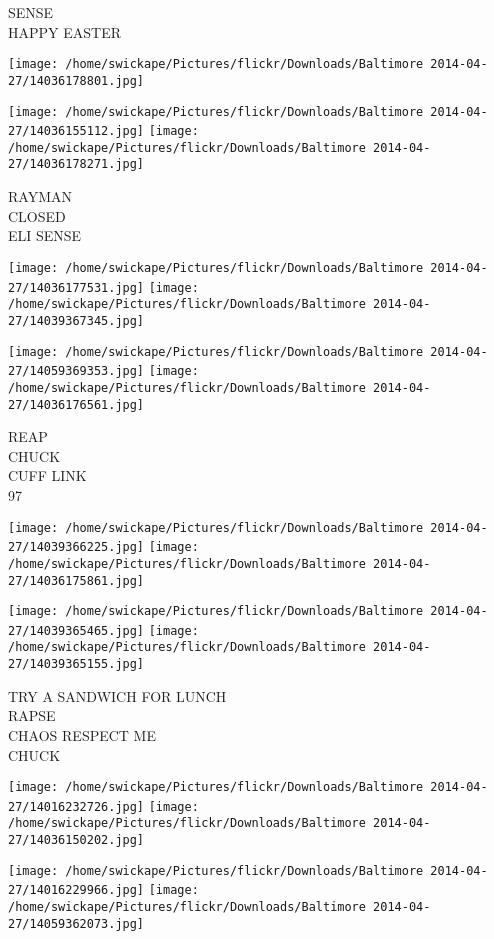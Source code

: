 \documentclass[10pt,letterpaper]{article}
\begin{document}
SENSE\\
HAPPY EASTER
\pagebreak

\texttt{[image: /home/swickape/Pictures/flickr/Downloads/Baltimore 2014-04-27/14036178801.jpg]}

\vspace{0.25in}
\texttt{[image: /home/swickape/Pictures/flickr/Downloads/Baltimore 2014-04-27/14036155112.jpg]}
\texttt{[image: /home/swickape/Pictures/flickr/Downloads/Baltimore 2014-04-27/14036178271.jpg]}

RAYMAN\\
CLOSED\\
ELI SENSE
\pagebreak

\texttt{[image: /home/swickape/Pictures/flickr/Downloads/Baltimore 2014-04-27/14036177531.jpg]}
\texttt{[image: /home/swickape/Pictures/flickr/Downloads/Baltimore 2014-04-27/14039367345.jpg]}

\texttt{[image: /home/swickape/Pictures/flickr/Downloads/Baltimore 2014-04-27/14059369353.jpg]}
\texttt{[image: /home/swickape/Pictures/flickr/Downloads/Baltimore 2014-04-27/14036176561.jpg]}

REAP\\
CHUCK\\
CUFF LINK\\
97
\pagebreak

\texttt{[image: /home/swickape/Pictures/flickr/Downloads/Baltimore 2014-04-27/14039366225.jpg]}
\texttt{[image: /home/swickape/Pictures/flickr/Downloads/Baltimore 2014-04-27/14036175861.jpg]}

\texttt{[image: /home/swickape/Pictures/flickr/Downloads/Baltimore 2014-04-27/14039365465.jpg]}
\texttt{[image: /home/swickape/Pictures/flickr/Downloads/Baltimore 2014-04-27/14039365155.jpg]}

TRY A SANDWICH FOR LUNCH\\
RAPSE\\
CHAOS RESPECT ME\\
CHUCK
\pagebreak

\texttt{[image: /home/swickape/Pictures/flickr/Downloads/Baltimore 2014-04-27/14016232726.jpg]}
\texttt{[image: /home/swickape/Pictures/flickr/Downloads/Baltimore 2014-04-27/14036150202.jpg]}

\texttt{[image: /home/swickape/Pictures/flickr/Downloads/Baltimore 2014-04-27/14016229966.jpg]}
\texttt{[image: /home/swickape/Pictures/flickr/Downloads/Baltimore 2014-04-27/14059362073.jpg]}
\end{document}
